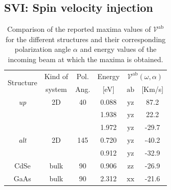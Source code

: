 \documentclass[prb,11pt,tightenlines,twocolumn,aps]{revtex4-1}
\begin{document}

\subsection{SVI: Spin velocity injection} %
\label{sec:res-spin_velocity}

\begin{table}[b]
\begin{tabular}{cccccc}
\hline
\multirow{2}{*}{Structure \quad} & 
Kind of \quad & 
Pol. &
Energy & 
\multicolumn{2}{c}{$\mathcal{V}^{\mathrm{ab}}(\omega,\alpha)$}\\
\cline{5-6}
& system & Ang. & [eV] & $\mathrm{ab}$ \quad & [Km/s]\\
\hline
\emph{up}    & 2D   & 40    & 0.088  & $\mathrm{yz}$ &  87.2    \\
             &      &       & 1.938  & $\mathrm{yz}$ &  22.2    \\
             &      &       & 1.972  & $\mathrm{yz}$ & -29.7    \\
\emph{alt}   & 2D   & 145   & 0.720  & $\mathrm{yz}$ & -40.2    \\
             &      &       & 0.912  & $\mathrm{yz}$ & -32.9    \\
 CdSe        & bulk & 90    & 0.906  & $\mathrm{zz}$ & -26.9    \\
 GaAs        & bulk & 90    & 2.312  & $\mathrm{xx}$ & -21.6    \\
\hline
\end{tabular}

\caption{Comparison of the reported maxima values of
$\mathcal{V}^{\mathrm{ab}}$ for the different structures and their
corresponding polarization angle $\alpha$ and energy values of the incoming
beam at which the maxima is obtained.}
\label{tab:vab-str-comp}
\end{table}
\end{document}
